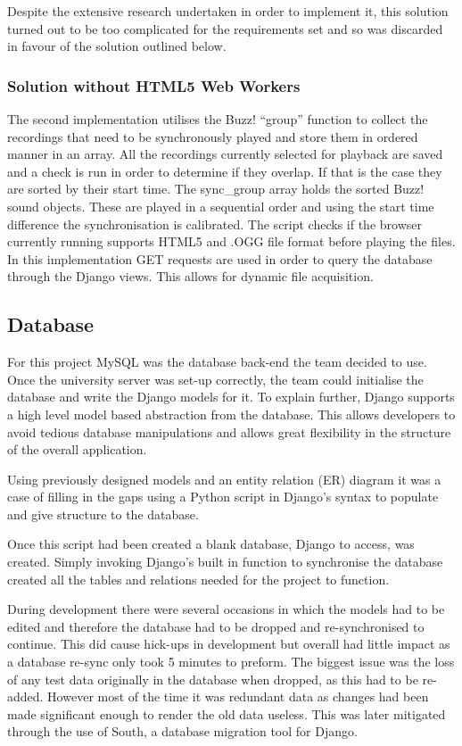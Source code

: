 \documentclass{l3proj}
\begin{document}
Despite the extensive research undertaken in order to implement it, this solution turned out to be too complicated for the requirements set and so was discarded in favour of the solution outlined below.

\subsubsection{Solution without HTML5 Web Workers}
The second implementation utilises the Buzz! “group” function to collect the recordings that need to be synchronously played and store them in ordered manner in an array. All the recordings currently selected for playback are saved and a check is run in order to determine if they overlap. If that is the case they are sorted by their start time. The sync\_group array holds the sorted Buzz! sound objects. These are played in a sequential order and using the start time difference the synchronisation is calibrated. The script checks if the browser currently running supports HTML5  and .OGG file format before playing the files. In this implementation GET requests are used in order to query the database through the Django views. This allows for dynamic file acquisition.

\subsection{Database}
For this project MySQL was the database back-end the team decided to use. Once the university server was set-up correctly, the team could initialise the database and write the Django models for it. To explain further, Django supports a high level model based abstraction from the database. This allows developers to avoid tedious database manipulations and allows great flexibility in the structure of the overall application.

Using previously designed models and an entity relation (ER) diagram it was a case of filling in the gaps using a Python script in Django's syntax to populate and give structure to the database.

Once this script had been created a blank database, Django to access, was created. Simply invoking Django's built in function to synchronise the database created all the tables and relations needed for the project to function.

During development there were several occasions in which the models had to be edited and therefore the database had to be dropped and re-synchronised to continue. This did cause hick-ups in development but overall had little impact as a database re-sync only took 5 minutes to preform. The biggest issue was the loss of any test data originally in the database when dropped, as this had to be re-added. However most of the time it was redundant data as changes had been made significant enough to render the old data useless. This was later mitigated through the use of South, a database migration tool for Django.
\end{document}
